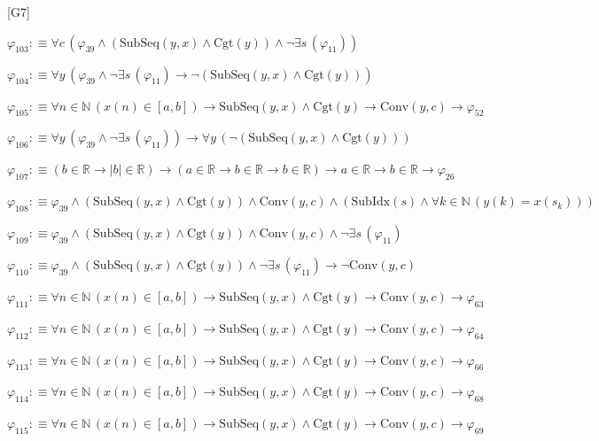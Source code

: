 \begin{fullproof}{[G7]}
\begin{abbrevlist}
\item $\varphi_{103} :\equiv \forall c\,(\varphi_{39} \land (\mathrm{SubSeq}(y,x) \land \mathrm{Cgt}(y)) \land \neg \exists s\,(\varphi_{11}))$
\item $\varphi_{104} :\equiv \forall y\,(\varphi_{39} \land \neg \exists s\,(\varphi_{11}) \to \neg (\mathrm{SubSeq}(y,x) \land \mathrm{Cgt}(y)))$
\item $\varphi_{105} :\equiv \forall n \in \mathbb{N}\,(x(n) \in [a,b]) \to \mathrm{SubSeq}(y,x) \land \mathrm{Cgt}(y) \to \mathrm{Conv}(y,c) \to \varphi_{52}$
\item $\varphi_{106} :\equiv \forall y\,(\varphi_{39} \land \neg \exists s\,(\varphi_{11})) \to \forall y\,(\neg (\mathrm{SubSeq}(y,x) \land \mathrm{Cgt}(y)))$
\item $\varphi_{107} :\equiv (b \in \mathbb{R} \to \lvert b \rvert \in \mathbb{R}) \to (a \in \mathbb{R} \to b \in \mathbb{R} \to b \in \mathbb{R}) \to a \in \mathbb{R} \to b \in \mathbb{R} \to \varphi_{26}$
\item $\varphi_{108} :\equiv \varphi_{39} \land (\mathrm{SubSeq}(y,x) \land \mathrm{Cgt}(y)) \land \mathrm{Conv}(y,c) \land (\mathrm{SubIdx}(s) \land \forall k \in \mathbb{N}\,(y(k) = x(s_{k})))$
\item $\varphi_{109} :\equiv \varphi_{39} \land (\mathrm{SubSeq}(y,x) \land \mathrm{Cgt}(y)) \land \mathrm{Conv}(y,c) \land \neg \exists s\,(\varphi_{11})$
\item $\varphi_{110} :\equiv \varphi_{39} \land (\mathrm{SubSeq}(y,x) \land \mathrm{Cgt}(y)) \land \neg \exists s\,(\varphi_{11}) \to \neg \mathrm{Conv}(y,c)$
\item $\varphi_{111} :\equiv \forall n \in \mathbb{N}\,(x(n) \in [a,b]) \to \mathrm{SubSeq}(y,x) \land \mathrm{Cgt}(y) \to \mathrm{Conv}(y,c) \to \varphi_{63}$
\item $\varphi_{112} :\equiv \forall n \in \mathbb{N}\,(x(n) \in [a,b]) \to \mathrm{SubSeq}(y,x) \land \mathrm{Cgt}(y) \to \mathrm{Conv}(y,c) \to \varphi_{64}$
\item $\varphi_{113} :\equiv \forall n \in \mathbb{N}\,(x(n) \in [a,b]) \to \mathrm{SubSeq}(y,x) \land \mathrm{Cgt}(y) \to \mathrm{Conv}(y,c) \to \varphi_{66}$
\item $\varphi_{114} :\equiv \forall n \in \mathbb{N}\,(x(n) \in [a,b]) \to \mathrm{SubSeq}(y,x) \land \mathrm{Cgt}(y) \to \mathrm{Conv}(y,c) \to \varphi_{68}$
\item $\varphi_{115} :\equiv \forall n \in \mathbb{N}\,(x(n) \in [a,b]) \to \mathrm{SubSeq}(y,x) \land \mathrm{Cgt}(y) \to \mathrm{Conv}(y,c) \to \varphi_{69}$

\end{abbrevlist}
\end{fullproof}

